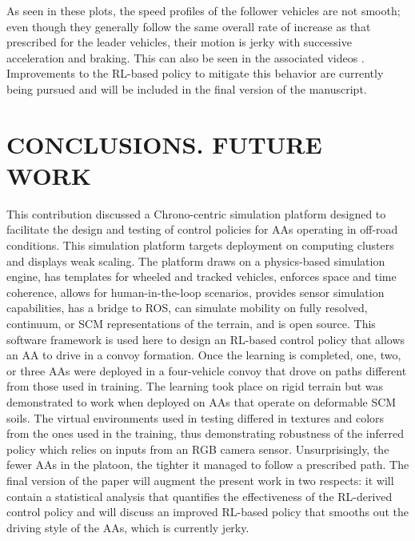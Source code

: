 \documentclass[12pt,twocolumn]{article}
\begin{document}
As seen in these plots, the speed profiles of the follower vehicles are not smooth; even though they generally follow the same overall rate of increase as that prescribed for the leader vehicles, their motion is jerky with successive acceleration and braking.  This can also be seen in the associated videos \cite{simsPaperGVSETS2020}.  Improvements to the RL-based policy to mitigate this behavior are currently being pursued and will be included in the final version of the manuscript.


\section{CONCLUSIONS. FUTURE WORK}\label{s:conclusion}
This contribution discussed a Chrono-centric simulation platform designed to facilitate the design and testing of control policies for AAs operating in off-road conditions. This simulation platform targets deployment on computing clusters and displays weak scaling. The platform draws on a physics-based simulation engine, has templates for wheeled and tracked vehicles, enforces space and time coherence, allows for human-in-the-loop scenarios, provides sensor simulation capabilities, has a bridge to ROS, can simulate mobility on fully resolved, continuum, or SCM representations of the terrain, and is open source. This software framework is used here to design an RL-based control policy that allows an AA to drive in a convoy formation. Once the learning is completed, one, two, or three AAs were deployed in a four-vehicle convoy that drove on paths different from those used in training. The learning took place on rigid terrain but was demonstrated to work when deployed on AAs that operate on deformable SCM soils. The virtual environments used in testing differed in textures and colors from the ones used in the training, thus demonstrating robustness of the inferred policy which relies on inputs from an RGB camera sensor. Unsurprisingly, the fewer AAs in the platoon, the tighter it managed to follow a prescribed path. The final version of the paper will augment the present work in two respects: it will contain a statistical analysis that quantifies the effectiveness of the RL-derived control policy and will discuss an improved RL-based policy that smooths out the driving style of the AAs, which is currently jerky.
\end{document}
